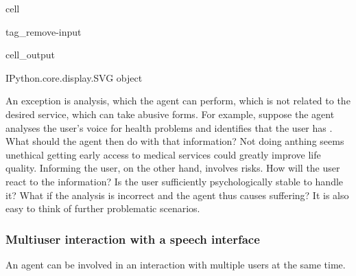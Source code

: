 \documentclass[letterpaper,10pt,english]{jupyterBook}
\begin{document}
\begin{sphinxuseclass}{cell}
\begin{sphinxuseclass}{tag_remove-input}\begin{sphinxVerbatimOutput}

\begin{sphinxuseclass}{cell_output}
\begin{sphinxVerbatim}[commandchars=\\\{\}]
\PYGZlt{}IPython.core.display.SVG object\PYGZgt{}
\end{sphinxVerbatim}

\end{sphinxuseclass}\end{sphinxVerbatimOutput}

\end{sphinxuseclass}
\end{sphinxuseclass}
\sphinxAtStartPar
An exception is analysis, which the agent can perform, which is not related to the desired service, which can take abusive forms. For example, suppose the agent analyses the user’s voice for health problems and identifies that the user has . What should the agent then do with that information? Not doing anthing seems unethical \sphinxhyphen{} getting early access to medical services could greatly improve life quality. Informing the user, on the other hand, involves risks. How will the user react to the information? Is the user sufficiently psychologically stable to handle it? What if the analysis is incorrect and the agent thus causes suffering? It is also easy to think of further problematic scenarios.


\subsubsection{Multi\sphinxhyphen{}user interaction with a speech interface}
\label{\detokenize{Security_and_privacy:multi-user-interaction-with-a-speech-interface}}
\sphinxAtStartPar
An agent can be involved in an interaction with multiple users at the same time.
\end{document}

